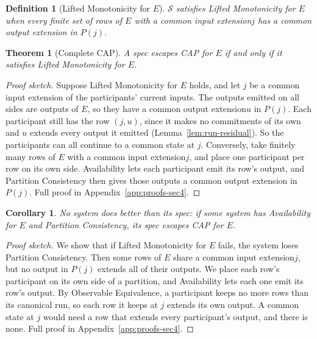 \documentclass[sigconf]{cidr-2027}
\newtheorem{theorem}{Theorem}
\newtheorem{corollary}{Corollary}
\newtheorem{definition}{Definition}
\theoremstyle{remark}
\newcommand{\commitments}{commitments\xspace}
\newcommand{\indesc}{input extension\xspace} %
\newcommand{\outrel}{extends\xspace}          %
\newcommand{\outnoun}{output extension\xspace}%
\newcommand{\Spec}{\mathcal{S}}
\newcommand{\fiber}[1]{P(#1)}
\begin{document}
\begin{definition}[Lifted Monotonicity for $E$]
\label{def:lm-for-A}
$\Spec$ satisfies \emph{Lifted Monotonicity for $E$} when every finite set of rows of $E$ with
a common \indesc $j$ has a common \outnoun in $\fiber{j}$.
\end{definition}

\begin{theorem}[Complete CAP]
\label{thm:complete-cap}
A spec escapes CAP for $E$ if and only if it satisfies Lifted Monotonicity for
$E$.
\end{theorem}

\begin{proof}[Proof sketch]
Suppose Lifted Monotonicity for $E$ holds, and let $j$ be a common \indesc of
the participants' current inputs.  The outputs emitted on all sides are outputs
of $E$, so they have a common \outnoun $u$ in $\fiber{j}$.  Each participant
still has the row $(j,u)$, since it makes no \commitments of its own and $u$
\outrel every output it emitted (Lemma~\ref{lem:run-residual}).  So the
participants can all continue to a common state at $j$.  Conversely, take
finitely many rows of $E$ with a common \indesc $j$, and place one participant
per row on its own side.  Availability lets each participant emit its row's
output, and Partition Consistency then gives those outputs a common \outnoun in
$\fiber{j}$.  Full proof in
Appendix~\ref{app:proofs-sec4}.
\end{proof}

\begin{corollary}
\label{cor:complete-cap-any-system}
No system does better than its spec: if some system has Availability for $E$
and Partition Consistency, its spec escapes CAP for $E$.
\end{corollary}

\begin{proof}[Proof sketch]
We show that if Lifted Monotonicity for $E$ fails, the system loses Partition
Consistency.  Then some rows of $E$ share a common \indesc $j$, but no output in
$\fiber{j}$ \outrel all of their outputs.  We place each row's participant on
its own side of a partition, and Availability lets each one emit its row's
output.  By Observable Equivalence, a participant keeps no more rows than its
canonical run, so each row it keeps at $j$ \outrel its own output.  A common
state at $j$ would need a row that \outrel every participant's output, and
there is none.  Full proof in Appendix~\ref{app:proofs-sec4}.
\end{proof}
\end{document}
